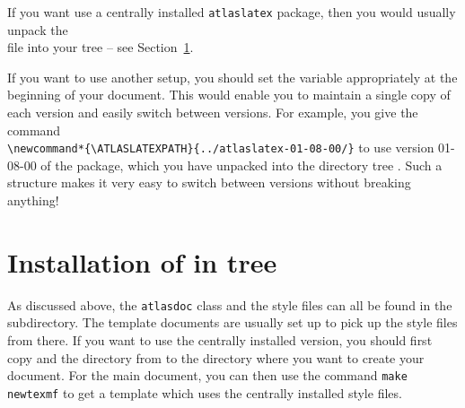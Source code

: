 If you want use a centrally installed \texttt{atlaslatex} package, then you would usually unpack the\\
 file into your  tree -- see Section~\ref{sec:texmf}.

If you want to use another setup, you should set the variable  appropriately
at the beginning of your document. This would enable you to maintain a single copy of each 
 version and easily switch between versions.
For example, you give the command\\
\verb|\newcommand*{\ATLASLATEXPATH}{../atlaslatex-01-08-00/}|
to use version 01-08-00 of the  package, which you have unpacked into the directory tree
.
Such a structure makes it very easy to switch between  versions without breaking anything!


\section{Installation of  in  tree}
\label{sec:texmf}

As discussed above, the \texttt{atlasdoc} class and the style files can all be found in the 
 subdirectory. The template documents are usually set up to pick up the style files from there.
If you want to use the centrally installed version,
you should first copy  and the  directory from 
 to the directory where you want to create your document.
For the main document, you can then use the command \texttt{make newtexmf} to get a template which uses the
centrally installed style files.

